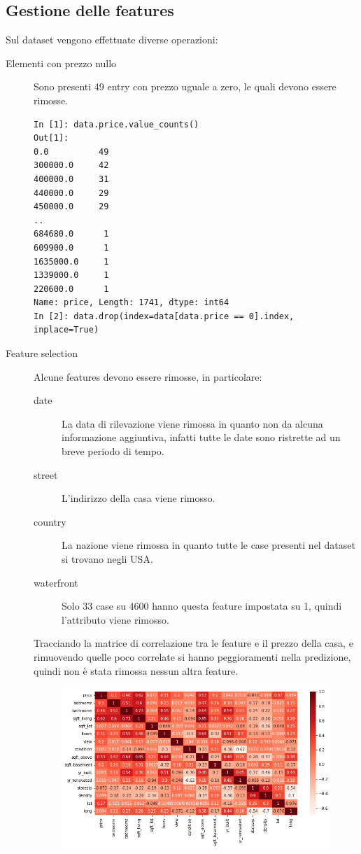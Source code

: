 \documentclass{article}
\begin{document}
\subsection{Gestione delle features}
Sul dataset vengono effettuate diverse operazioni:
\begin{description}
	\item[Elementi con prezzo nullo] Sono presenti 49 entry con prezzo uguale a
		zero, le quali devono essere rimosse.
		\begin{verbatim}
In [1]: data.price.value_counts()
Out[1]:
0.0          49
300000.0     42
400000.0     31
440000.0     29
450000.0     29
..
684680.0      1
609900.0      1
1635000.0     1
1339000.0     1
220600.0      1
Name: price, Length: 1741, dtype: int64
In [2]: data.drop(index=data[data.price == 0].index, inplace=True)
		\end{verbatim}
	\item[Feature selection] Alcune features devono essere rimosse, in
		particolare:
		\begin{description}
			\item[date] La data di rilevazione viene rimossa in quanto non da
				alcuna informazione aggiuntiva, infatti tutte le date sono
				ristrette ad un breve periodo di tempo.
			\item[street] L'indirizzo della casa viene rimosso.
			\item[country] La nazione viene rimossa in quanto tutte le case
				presenti nel dataset si trovano negli USA.
			\item[waterfront] Solo 33 case su 4600 hanno questa feature
				impostata su 1, quindi l'attributo viene rimosso.
		\end{description}
		Tracciando la matrice di correlazione tra le feature e il prezzo della
		casa, e rimuovendo quelle poco correlate si hanno peggioramenti nella
		predizione, quindi non è stata rimossa nessun altra feature.
		\begin{figure}[ht]
			\centering
			\begin{minipage}{0.48\textwidth}
				\centering
				\includegraphics[width=\textwidth]{correlazione.png}

\end{minipage}
\end{figure}
\end{description}
\end{document}
